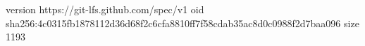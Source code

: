 version https://git-lfs.github.com/spec/v1
oid sha256:4c0315fb1878112d36d68f2c6cfa8810ff7f58cdab35ac8d0c0988f2d7baa096
size 1193
